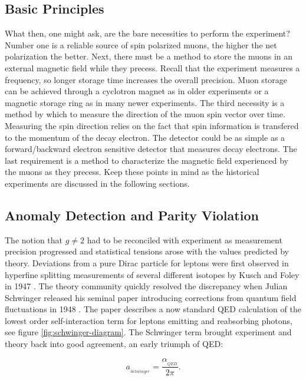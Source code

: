 \subsection{Basic Principles}
What then, one might ask, are the bare necessities to perform the \gmtwo experiment?  Number one is a reliable source of spin polarized muons, the higher the net polarization the better.  Next, there must be a method to store the muons in an external magnetic field while they precess.  Recall that the experiment measures a frequency, so longer storage time increases the overall precision. Muon storage can be achieved through a cyclotron magnet as in older experiments or a magnetic storage ring as in many newer experiments.  The third necessity is a method by which to measure the direction of the muon spin vector over time.  Measuring the spin direction relies on the fact that spin information is transfered to the momentum of the decay electron.  The detector could be as simple as a forward/backward electron sensitive detector that measures decay electrons.  The last requirement is a method to characterize the magnetic field experienced by the muons as they precess.  Keep these points in mind as the historical experiments are discussed in the following sections.

\subsection{Anomaly Detection and Parity Violation}

The notion that $g \ne 2$ had to be reconciled with experiment as measurement precision progressed and statistical tensions arose with the values predicted by theory.  Deviations from a pure Dirac particle for leptons were first observed in hyperfine splitting measurements of several different isotopes by Kusch and Foley in 1947 \cite{kusch-foley}.  The theory community quickly resolved the discrepancy when Julian Schwinger released his seminal paper introducing corrections from quantum field fluctuations in 1948 \cite{schwinger}.  The paper describes a now standard QED calculation of the lowest order self-interaction term for leptons emitting and reabsorbing photons, see figure \ref{fig:schwinger-diagram}.  The Schwinger term brought experiment and theory back into good agreement, an early triumph of QED:

\begin{equation}
\label{eqn:schwinger-correction}
a_{_{Schwinger}} = \frac{\alpha_{_{QED}}}{2\pi}.
\end{equation}

